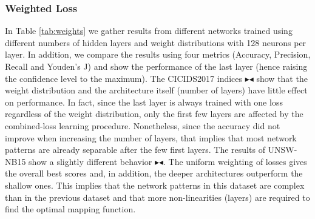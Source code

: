\documentclass[conference]{IEEEtran}
\newcommand{\mynote}[3]{
    \fbox{\bfseries\sffamily\scriptsize#1}
    {\small$\blacktriangleright$\textsf{\emph{\color{#3}{#2}}}$\blacktriangleleft$}}
\newcommand{\todo}[1]{\mynote{TODO}{#1}{red}}
\begin{document}
\subsubsection{Weighted Loss}
In Table \ref{tab:weights} we gather results from different networks trained using different numbers of hidden layers and weight distributions with 128 neurons per layer. In addition, we compare the results using four metrics (Accuracy, Precision, Recall and Youden's J) and show the performance of the last layer (hence raising the confidence level to the maximum). The CICIDS2017 indices \todo{Max: Indices?} show that the weight distribution and the architecture itself (number of layers) have little effect on performance. In fact, since the last layer is always trained with one loss regardless of the weight distribution, only the first few layers are affected by the combined-loss learning procedure. Nonetheless, since the accuracy did not improve when increasing the number of layers, that implies that most network patterns are already separable after the few first layers. The results of UNSW-NB15 show a slightly different behavior \todo{Max: Sure? All the results look the same?}. The uniform weighting of losses gives the overall best scores and, in addition, the deeper architectures outperform the shallow ones. This implies that the network patterns in this dataset are complex than in the previous dataset and that more non-linearities (layers) are required to find the optimal mapping function.
\end{document}

